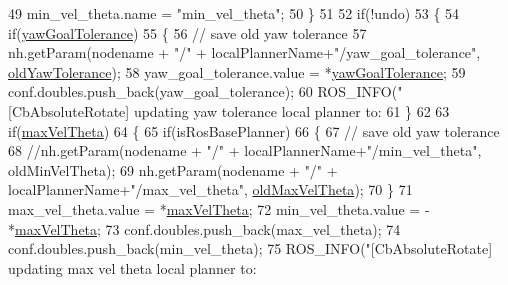 \begin{DoxyCode}
49         min\_vel\_theta.name = \textcolor{stringliteral}{"min\_vel\_theta"};
50     \}
51     
52     \textcolor{keywordflow}{if}(!undo)
53     \{
54        \textcolor{keywordflow}{if}(\hyperlink{classcl__move__base__z_1_1CbAbsoluteRotate_a8d8b5b9c2c821efe101bb07c96c4bdd3}{yawGoalTolerance})
55        \{
56             \textcolor{comment}{// save old yaw tolerance}
57             nh.getParam(nodename + \textcolor{stringliteral}{"/"}  + localPlannerName+\textcolor{stringliteral}{"/yaw\_goal\_tolerance"}, 
      \hyperlink{classcl__move__base__z_1_1CbAbsoluteRotate_a2cfcd2978e7923494e2e66107e134e27}{oldYawTolerance});
58             yaw\_goal\_tolerance.value = *\hyperlink{classcl__move__base__z_1_1CbAbsoluteRotate_a8d8b5b9c2c821efe101bb07c96c4bdd3}{yawGoalTolerance};
59             conf.doubles.push\_back(yaw\_goal\_tolerance);
60             ROS\_INFO(\textcolor{stringliteral}{"[CbAbsoluteRotate] updating yaw tolerance local planner to: %
61        \}
62 
63        \textcolor{keywordflow}{if}(\hyperlink{classcl__move__base__z_1_1CbAbsoluteRotate_ac0018b01a202dd805e3d3b50ed205d23}{maxVelTheta})
64        \{
65            \textcolor{keywordflow}{if}(isRosBasePlanner)
66            \{
67                 \textcolor{comment}{// save old yaw tolerance}
68                 \textcolor{comment}{//nh.getParam(nodename + "/"  + localPlannerName+"/min\_vel\_theta", oldMinVelTheta);}
69                 nh.getParam(nodename + \textcolor{stringliteral}{"/"}  + localPlannerName+\textcolor{stringliteral}{"/max\_vel\_theta"}, 
      \hyperlink{classcl__move__base__z_1_1CbAbsoluteRotate_a131095d57ad3fd423bb9eaebebf61cc9}{oldMaxVelTheta});
70            \}
71             max\_vel\_theta.value = *\hyperlink{classcl__move__base__z_1_1CbAbsoluteRotate_ac0018b01a202dd805e3d3b50ed205d23}{maxVelTheta};
72             min\_vel\_theta.value = -*\hyperlink{classcl__move__base__z_1_1CbAbsoluteRotate_ac0018b01a202dd805e3d3b50ed205d23}{maxVelTheta};
73             conf.doubles.push\_back(max\_vel\_theta);
74             conf.doubles.push\_back(min\_vel\_theta);
75             ROS\_INFO(\textcolor{stringliteral}{"[CbAbsoluteRotate] updating max vel theta local planner to: %
}}
\end{DoxyCode}
